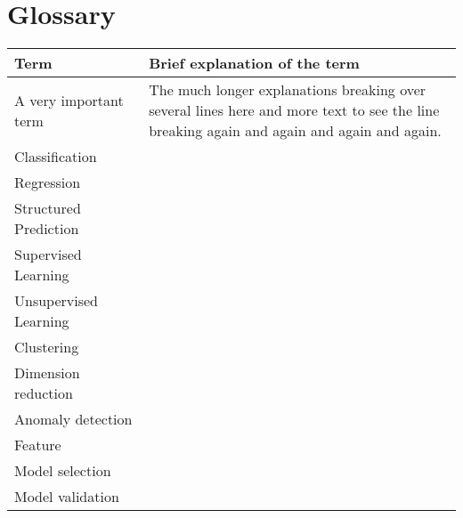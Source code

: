 \documentclass[MachineLearning]{subfiles}
\begin{document}
\section{Glossary}
\renewcommand{\arraystretch}{1.5}


\begin{tabular}{|p{0.3\linewidth}|p{0.7\linewidth}}
\hline
\textbf{Term} & \textbf{Brief explanation of the term}\\
\hline
A very important term & The much longer explanations breaking over several lines here and more text to see the line breaking again and again and again and again.\\
Classification &  \\
Regression &  \\
Structured Prediction &  \\
Supervised Learning &  \\
Unsupervised Learning &  \\
Clustering & \\
Dimension reduction & \\
Anomaly detection & \\
Feature & \\
Model selection & \\
Model validation & \\
\end{tabular}
\end{document}
